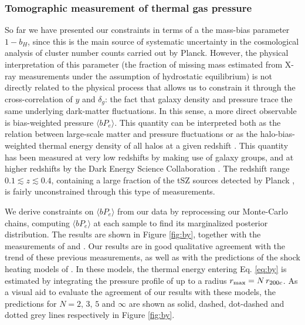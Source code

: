 \documentclass[useAMS,usenatbib]{mn2e}
\begin{document}
    \subsubsection{Tomographic measurement of thermal gas pressure}\label{ssec:results.fid.bpe}
      So far we have presented our constraints in terms of a the mass-bias parameter $1-b_H$, since this is the main source of systematic uncertainty in the cosmological analysis of cluster number counts carried out by Planck. However, the physical interpretation of this parameter (the fraction of missing mass estimated from X-ray measurements under the assumption of hydrostatic equilibrium) is not directly related to the physical process that allows us to constrain it through the cross-correlation of $y$ and $\delta_g$: the fact that galaxy density and pressure trace the same underlying dark-matter fluctuations. In this sense, a more direct observable is bias-weighted pressure $\langle bP_e\rangle$. This quantity can be interpreted both as the relation between large-scale matter and pressure fluctuations or as the halo-bias-weighted thermal energy density of all halos at a given redshift \cite{2017JCAP...11..040B}. This quantity has been measured at very low redshifts by \cite{2017MNRAS.467.2315V} making use of galaxy groups, and at higher redshifts by the Dark Energy Science Collaboration \cite{2019arXiv190413347P}. The redshift range $0.1\lesssim z\lesssim0.4$, containing a large fraction of the tSZ sources detected by Planck \citep{2016A&A...594A..27P}, is fairly unconstrained through this type of measurements.

      We derive constraints on $\langle bP_e\rangle$ from our data by reprocessing our Monte-Carlo chains, computing $\langle bP_e\rangle$ at each sample to find its marginalized posterior distribution. The results are shown in Figure \ref{fig:by}, together with the measurements of \cite{2017MNRAS.467.2315V} and \cite{2019arXiv190413347P}. Our results are in good qualitative agreement with the trend of these previous measurements, as well as with the predictions of the shock heating models of \cite{2012ApJ...758...75B}. In these models, the thermal energy entering Eq. \ref{eq:by} is estimated by integrating the pressure profile of \cite{2012ApJ...758...75B} up to a radius $r_{\rm max}=N\,r_{200c}$. As a visual aid to evaluate the agreement of our results with these models, the predictions for $N=2,\,3,\,5$ and $\infty$ are shown as solid, dashed, dot-dashed and dotted grey lines respectively in Figure \ref{fig:by}.
\end{document}
